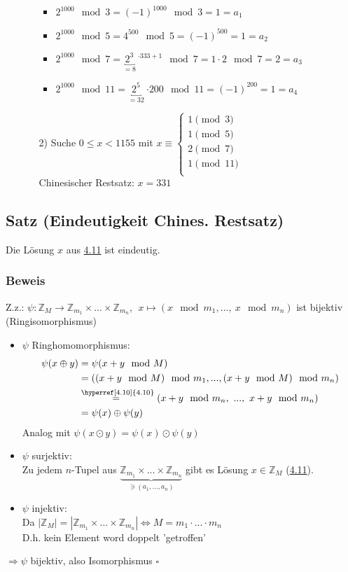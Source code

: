 \documentclass[12pt,titlepage, pdf]{article}
\newcommand{\qed}{\hfill$\square$}
\renewcommand{\>}{\rightarrow}
\renewcommand{\*}{\cdot}
\begin{document}
\begin{itemize}
\begin{itemize}
\begin{itemize}
			\item $2^{1000} \mod 3 = (-1)^{1000} \mod 3 = 1=a_1$
			\item $2^{1000} \mod 5 = 4^{500} \mod 5 = (-1)^{500} = 1=a_2$
			\item $2^{1000} \mod 7 = \underbracket{2^3}_{=8}~^{\*333+1} \mod 7 = 1 \cdot 2\mod 7 = 2=a_3$
			\item $2^{1000} \mod 11 = \underbracket{2^5}_{=32}~{\*200} \mod 11 = (-1)^{200} = 1=a_4$
		\end{itemize}
		\item[2)] Suche $0 \leq x < 1155$ mit $x \equiv \begin{cases*}
		1 \pmod{3}\\
		1 \pmod {5}\\
		2 \pmod {7}\\
		1 \pmod{ 11}\\
		\end{cases*}$\\
		Chinesischer Restsatz: $x = 331$
	\end{itemize}
\end{itemize}
\subsection{Satz (Eindeutigkeit Chines. Restsatz)}
\label{4.13}
Die Lösung $x$ aus \hyperref[4.11]{4.11} ist eindeutig.
\subsubsection*{Beweis}
Z.z.: $\psi : \mathbb{Z}_M \rightarrow \mathbb{Z}_{m_1} \times ... \times \mathbb{Z}_{m_n},~~ x \mapsto (x \mod m_1,...,~x \mod m_n)$ ist bijektiv (Ringisomorphismus)
\begin{itemize}
	\item $\psi$ Ringhomomorphismus:
	\begin{align*}
	\psi (x \oplus y) &= \psi(x+y \mod M)\\
	&= ((x+y \mod M) \mod m_1,..., (x+y \mod M) \mod m_n)\\
	&\overset{\textrm{\hyperref[4.10]{4.10}}}{=~} (x+y \mod m_n,~..., ~x+y \mod m_n) \\
	&= \psi(x) \oplus \psi(y)
	\end{align*}
	Analog mit $\psi(x \odot y) = \psi(x) \odot \psi(y)$
	\item $\psi$ surjektiv:\\
	Zu jedem $n$-Tupel aus $\underbrace{\mathbb{Z}_{m_1} \times ... \times \mathbb{Z}_{m_n}}_{\ni(a_1,...,a_n)}$ gibt es Lösung $x \in \mathbb{Z}_M$ (\hyperref[4.11]{4.11}).
	\item $\psi$ injektiv: \\
	Da $| \mathbb{Z}_M| = | \mathbb{Z}_{m_1} \times ... \times \mathbb{Z}_{m_n}| \Leftrightarrow M = m_1 \cdot ... \cdot m_n$ \\
	D.h. kein Element word doppelt 'getroffen' \\
\end{itemize}
$\Rightarrow \psi$ bijektiv, also Isomorphismus 
\qed
\end{document}
